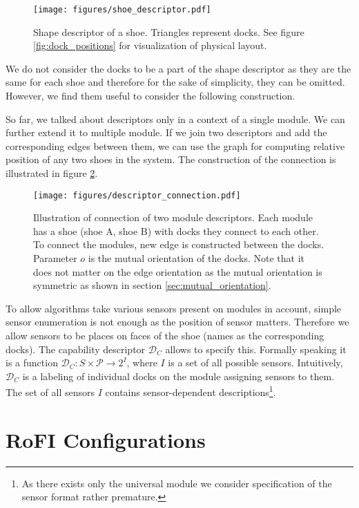 \begin{figure}[h!]
    \centering
    \texttt{[image: figures/shoe\_descriptor.pdf]}
    \caption{Shape descriptor of a shoe. Triangles represent docks. See figure
    \ref{fig:dock_positions} for visualization of physical layout.}
    \label{fig:shoe_descriptor}
\end{figure}

We do not consider the docks to be a part of the shape descriptor as they are
the same for each shoe and therefore for the sake of simplicity, they can be
omitted. However, we find them useful to consider the following construction.

So far, we talked about descriptors only in a context of a single module. We can
further extend it to multiple module. If we join two descriptors and add the
corresponding edges between them, we can use the graph for computing relative
position of any two shoes in the system. The construction of the connection is
illustrated in figure \ref{fig:connection_descriptor}.

\begin{figure}[h!]
    \centering
    \texttt{[image: figures/descriptor\_connection.pdf]}
    \caption{Illustration of connection of two module descriptors. Each module
    has a shoe (shoe A, shoe B) with docks they connect to each other. To
    connect the modules, new edge is constructed between the docks. Parameter
    $o$ is the mutual orientation of the docks. Note that it does not matter on
    the edge orientation as the mutual orientation is symmetric as shown in
    section \ref{sec:mutual_orientation}. }
    \label{fig:connection_descriptor}
\end{figure}


To allow algorithms take various sensors present on modules in account, simple
sensor enumeration is not enough as the position of sensor matters. Therefore we
allow sensors to be places on faces of the shoe (names as the corresponding
docks). The capability descriptor $\mathcal{D}_C$ allows to specify this.
Formally speaking it is a function $\mathcal{D}_C: S\times\mathcal{P}
\rightarrow 2^{I}$, where $I$ is a set of all possible sensors. Intuitively,
$\mathcal{D}_C$ is a labeling of individual docks on the module assigning
sensors to them. The set of all sensors $I$ contains sensor-dependent
descriptions\footnote{As there exists only the universal module we consider
specification of the sensor format rather premature.}.

\section{RoFI Configurations} \label{sec:configuration}

